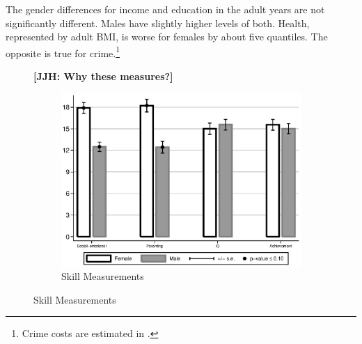 The gender differences for income and education in the adult years are not significantly different. Males have slightly higher levels of both. Health, represented by adult BMI, is worse for females by about five quantiles. The opposite is true for crime.\footnote{Crime costs are estimated in \citet{Garcia_Heckman_Leaf_etal_2017_Comp_CBA_Unpublished}.}

\begin{figure}[!htbp]
\textbf{[JJH: Why these measures?]}
\centering
\caption{Differences Between ABC/CARE Males and Females}
\label{fig:intro-gdiff-plots}
\begin{subfigure}[h]{0.59\textwidth}
	\centering
	\caption{Skill Measurements}
	\label{fig:intro-skills-plots-skills}
	\includegraphics[width=\textwidth]{output/abccare-gdiff-skills}
\end{subfigure}


\end{figure}
